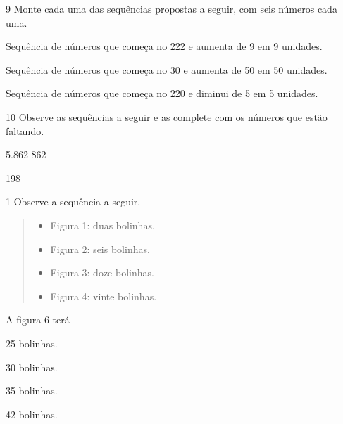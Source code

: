 \num{9} Monte cada uma das sequências propostas a seguir, com seis números cada uma.

\begin{escolha}
\item
  Sequência de números que começa no 222 e aumenta de 9 em 9 unidades.


\item
  Sequência de números que começa no 30 e aumenta de 50 em 50 unidades.


\item
  Sequência de números que começa no 220 e diminui de 5 em 5 unidades.

\end{escolha}

\num{10} Observe as sequências a seguir e as complete com os números que estão
faltando.

\begin{escolha}
\item 5.862   \quad {}\quad {}  862

\item 198   \quad {}
\end{escolha}


\num{1} Observe a sequência a seguir.

\begin{quote}
\begin{itemize}
  \item Figura 1: duas bolinhas.
  \item Figura 2: seis bolinhas.
  \item Figura 3: doze bolinhas.
  \item Figura 4: vinte bolinhas.
\end{itemize}
\end{quote}

 A figura 6 terá

\begin{escolha}
\item
  25 bolinhas.
\item
  30 bolinhas.
\item
  35 bolinhas.
\item
  42 bolinhas.
\end{escolha}

